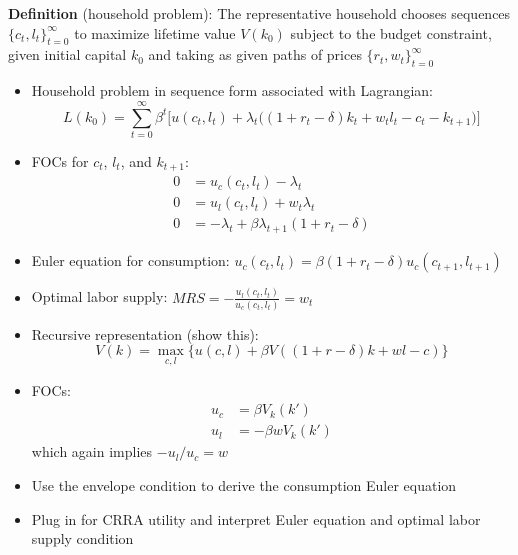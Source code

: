 \documentclass[10pt]{beamer}
\begin{document}
\begin{frame}{}
\textbf{Definition} (household problem): The representative household chooses sequences $\{c_t, l_t\}_{t=0}^\infty$ to maximize lifetime value $V(k_0)$ subject to the budget constraint, given initial capital $k_0$ and taking as given paths of prices $\{r_t, w_t\}_{t=0}^\infty$

\vspace{6mm}
\begin{itemize}
\item Household problem in sequence form associated with Lagrangian:
\begin{equation*}
	L(k_0) = \sum_{t = 0}^\infty \beta^t \bigg[ u(c_t, l_t) + \lambda_t \bigg( (1 + r_t - \delta) k_t + w_t l_t - c_t - k_{t+1} \bigg) \bigg]
\end{equation*}

\item FOCs for $c_t$, $l_t$, and $k_{t+1}$:
\begin{align*}
	0 &= u_c(c_t, l_t) - \lambda_t \\
	0 &= u_l(c_t, l_t) + w_t \lambda_t \\
	0 &= - \lambda_t + \beta \lambda_{t+1} (1 + r_t - \delta)
\end{align*}

\item Euler equation for consumption: $u_c(c_t, l_t) = \beta (1 + r_t - \delta) u_c(c_{t+1}, l_{t+1})$

\item Optimal labor supply: $MRS = - \frac{u_l(c_t, l_t)}{u_c(c_t, l_t)} = w_t$
\end{itemize}
\end{frame}



\begin{frame}{}
\begin{itemize}
\item Recursive representation (show this):
\begin{equation*}
	V(k) = \max_{c, l} \bigg\{ u(c, l) + \beta V((1 + r - \delta) k + w l - c) \bigg\}
\end{equation*}

\item FOCs:
\begin{align*}
	u_c &= \beta V_k(k') \\
	u_l &= - \beta w V_k(k')
\end{align*}
which again implies $- u_l / u_c = w$

\item Use the envelope condition to derive the consumption Euler equation

\item Plug in for CRRA utility and interpret Euler equation and optimal labor supply condition
\end{itemize}
\end{frame}
\end{document}
